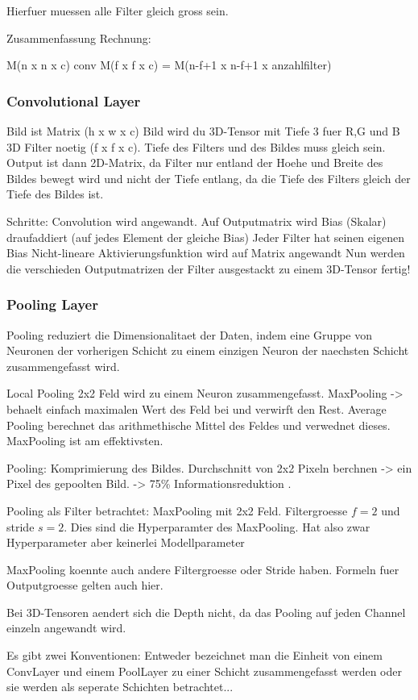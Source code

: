 \documentclass[../main]{subfiles}
\begin{document}
Hierfuer muessen alle Filter gleich gross sein.

Zusammenfassung Rechnung:

M(n x n x c) conv M(f x f x c) = M(n-f+1 x n-f+1 x anzahlfilter)

\subsubsection{Convolutional Layer}
Bild ist Matrix (h x w x c)
Bild wird du 3D-Tensor mit Tiefe 3 fuer R,G und B
3D Filter noetig (f x f x c). Tiefe des Filters und des Bildes muss gleich sein.
Output ist dann 2D-Matrix, da Filter nur entland der Hoehe und Breite des Bildes
bewegt wird und nicht der Tiefe entlang, da die Tiefe des Filters gleich der
Tiefe des Bildes ist.

Schritte:
Convolution wird angewandt.
Auf Outputmatrix wird Bias (Skalar) draufaddiert (auf jedes Element der gleiche Bias)
Jeder Filter hat seinen eigenen Bias
Nicht-lineare Aktivierungsfunktion wird auf Matrix angewandt
Nun werden die verschieden Outputmatrizen der Filter ausgestackt zu einem
3D-Tensor
fertig!
\subsubsection{Pooling Layer}
Pooling reduziert die Dimensionalitaet der Daten, indem eine Gruppe von Neuronen
der vorherigen Schicht zu einem einzigen Neuron der naechsten Schicht
zusammengefasst wird.

Local Pooling 2x2 Feld wird zu einem Neuron zusammengefasst. MaxPooling ->
behaelt einfach maximalen Wert des Feld bei und verwirft den Rest. Average
Pooling berechnet das arithmethische Mittel des Feldes und verwednet dieses.
MaxPooling ist am effektivsten.

Pooling:
Komprimierung des Bildes. Durchschnitt von 2x2 Pixeln berchnen -> ein Pixel des
gepoolten Bild. -> 75\% Informationsreduktion .

Pooling als Filter betrachtet:
MaxPooling mit 2x2 Feld. Filtergroesse $f=2$ und stride $s=2$. Dies sind die
Hyperparamter des MaxPooling. Hat also zwar Hyperparameter aber keinerlei Modellparameter

MaxPooling koennte auch andere Filtergroesse oder Stride haben. Formeln fuer
Outputgroesse gelten auch hier.

Bei 3D-Tensoren aendert sich die Depth nicht, da das Pooling auf jeden Channel
einzeln angewandt wird.


Es gibt zwei Konventionen:
Entweder bezeichnet man die Einheit von einem ConvLayer und einem PoolLayer zu
einer Schicht zusammengefasst werden oder sie werden als seperate Schichten betrachtet...
\end{document}
